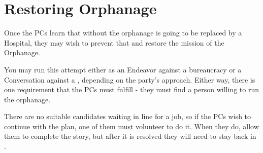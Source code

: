 \section{Restoring Orphanage}
\label{sec:restoreOrphanage}

Once the PCs learn that without \npcArshqqam{} the orphanage is going to be replaced by a \locationKharbranth{} Hospital, they may wish to prevent that and restore the mission of the Orphanage.

You may run this attempt either as an Endeavor against a \locationYeddaw{} bureaucracy or a Conversation against a \enemyScribeC{}, depending on the party's approach. Either way, there is one requirement that the PCs must fulfill - they must find a person willing to run the orphanage.

There are no suitable candidates waiting in line for a job, so if the PCs wish to continue with the plan, one of them must volunteer to do it. When they do, allow them to complete the story, but after it is resolved they will need to stay back in \locationYeddaw{}.





